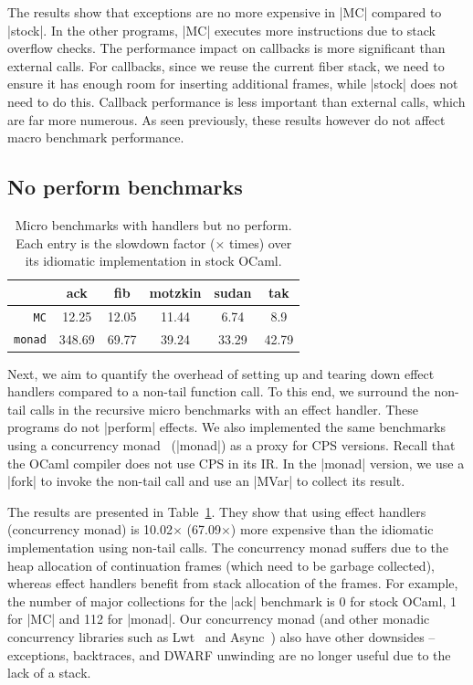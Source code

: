 \documentclass[sigplan,screen]{acmart}
\begin{document}
The results show that exceptions are no more expensive in |MC| compared to
|stock|. In the other programs, |MC| executes more instructions due to stack
overflow checks. The performance impact on callbacks is more significant than
external calls. For callbacks, since we reuse the current fiber stack, we need
to ensure it has enough room for inserting additional frames, while |stock|
does not need to do this. Callback performance is less important than external
calls, which are far more numerous. As seen previously, these results however
do not affect macro benchmark performance.

\subsection{No perform benchmarks}

\begin{table}
\caption{Micro benchmarks with handlers but no perform. Each entry is the
	slowdown factor ($\times$ times) over its idiomatic implementation in stock OCaml.}
\vspace{-3mm}
{
\begin{tabular}{r c c c c c}
	& \textbf{ack} & \textbf{fib} & \textbf{motzkin} & \textbf{sudan} & \textbf{tak} \\ \hline
	\texttt{MC} 	 	& 12.25 & 12.05 & 11.44 & 6.74 & 8.9 \\
	\texttt{monad} 	& 348.69 & 69.77 & 39.24 & 33.29 & 42.79 \\ \hline
\end{tabular}
}
\label{tab:micro_noperform}
\vspace{-3mm}
\end{table}

Next, we aim to quantify the overhead of setting up and tearing down effect
handlers compared to a non-tail function call. To this end, we surround the
non-tail calls in the recursive micro benchmarks with an effect handler. These
programs do not |perform| effects. We also implemented the same benchmarks using
a concurrency monad~\cite{Claessen99} (|monad|) as a proxy for CPS versions.
Recall that the OCaml compiler does not use CPS in its IR. In the |monad|
version, we use a |fork| to invoke the non-tail call and use an |MVar| to
collect its result.

The results are presented in Table~\ref{tab:micro_noperform}. They show that
using effect handlers (concurrency monad) is 10.02$\times$ (67.09$\times$) more
expensive than the idiomatic implementation using non-tail calls. The
concurrency monad suffers due to the heap allocation of continuation frames
(which need to be garbage collected), whereas effect handlers benefit from
stack allocation of the frames. For example, the number of major collections
for the |ack| benchmark is 0 for stock OCaml, 1 for |MC| and 112 for |monad|.
Our concurrency monad (and other monadic concurrency libraries such as
Lwt~\cite{lwt} and Async~\cite{async}) also have other downsides -- exceptions,
backtraces, and DWARF unwinding are no longer useful due to the lack of a
stack.
\end{document}
